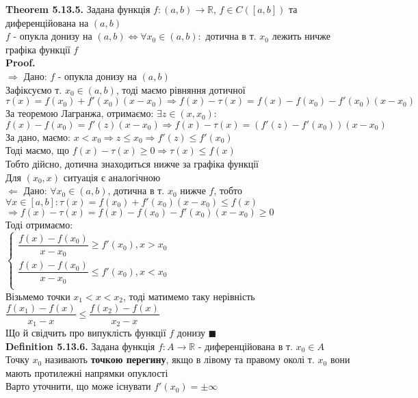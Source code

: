 \documentclass[a4paper, 14pt]{extarticle}
\def\bigline{\vspace{5mm}\\}
\def\defin#1{\textbf{Definition {#1}}}
\def\th#1{\textbf{Theorem {#1}}}
\def\proof{\textbf{Proof.}\\}
\def\bigline{\vspace{5mm}\\}
\def\qed{$\blacksquare$}
\begin{document}
\th{5.13.5.} Задана функція $f: (a,b) \to \mathbb{R}$, $f \in C([a,b])$ та диференційована на $(a,b)$\\
$f$ - опукла донизу на $(a,b) \iff \forall x_0 \in (a,b):$ дотична в т. $x_0$ лежить ничже графіка функції $f$\\
\proof
$\boxed{\Rightarrow}$ Дано: $f$ - опукла донизу на $(a,b)$\\
Зафіксуємо т. $x_0 \in (a,b)$, тоді маємо рівняння дотичної\\
$\tau(x) = f(x_0) + f'(x_0)(x-x_0) \Rightarrow f(x) - \tau(x) = f(x) - f(x_0) - f'(x_0)(x-x_0)$\\
За теоремою Лагранжа, отримаємо: $\exists z \in (x,x_0):$ \\
$f(x) - f(x_0) = f'(z)(x-x_0) \Rightarrow f(x) - \tau(x) = (f'(z) - f'(x_0))(x-x_0)$\\
За дано, маємо: $x < x_0 \Rightarrow z \leq x_0 \Rightarrow f'(z) \leq f'(x_0)$\\
Тоді маємо, що $f(x) - \tau(x) \geq 0 \Rightarrow \tau(x) \leq f(x)$\\
Тобто дійсно, дотична знаходиться нижче за графіка функції\\
Для $(x_0,x)$ ситуація є аналогічною
\bigline
$\boxed{\Leftarrow}$ Дано: $\forall x_0 \in (a,b)$, дотична в т. $x_0$ нижче $f$, тобто\\
$\forall x \in [a,b]: \tau(x) = f(x_0) + f'(x_0)(x-x_0) \leq f(x)$\\
$\Rightarrow f(x) - \tau(x) = f(x) - f(x_0) - f'(x_0)(x-x_0) \geq 0$\\
Тоді отримаємо:\\
$\begin{cases}
\dfrac{f(x)-f(x_0)}{x-x_0} \geq f'(x_0), x > x_0 \\
\dfrac{f(x)-f(x_0)}{x-x_0} \leq f'(x_0), x < x_0 \\
\end{cases}
$\\
Візьмемо точки $x_1 < x < x_2$, тоді матимемо таку нерівність\\
$\dfrac{f(x_1)-f(x)}{x_1-x} \leq \dfrac{f(x_2)-f(x)}{x_2-x}$\\
Що й свідчить про випуклість функції $f$ донизу \qed
\bigline

\defin{5.13.6.} Задана функція $f: A \to \mathbb{R}$ - диференційована в т. $x_0 \in A$\\
Точку $x_0$ називають \textbf{точкою перегину}, якщо в лівому та правому околі т. $x_0$ вони мають протилежні напрямки опуклості\\
Варто уточнити, що може існувати $f'(x_0) = \pm \infty$
\bigline
\end{document}
